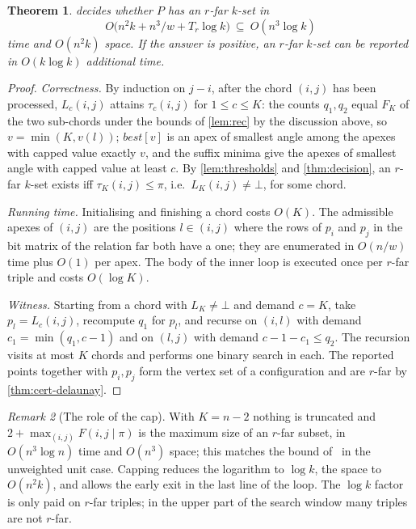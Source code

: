 \documentclass[11pt,a4paper]{article}
\newtheorem{theorem}{Theorem}
\theoremstyle{definition}
\theoremstyle{remark}
\newtheorem{remark}[theorem]{Remark}
\newcommand{\far}{\mathrm{far}}
\newcommand{\Tr}{T_r}
\newcommand{\nil}{\bot}
\begin{document}
\begin{theorem}\label{thm:decision-alg}
 decides whether $P$ has an $r$-far $k$-set in
\[
O\bigl(n^2k+n^3/w+\Tr\log k\bigr)\ \subseteq\ O(n^3\log k)
\]
time and $O(n^2k)$ space. If the answer is positive, an $r$-far $k$-set can be
reported in $O(k\log k)$ additional time.
\end{theorem}
\begin{proof}
\emph{Correctness.} By induction on $j-i$, after the chord $(i,j)$ has been
processed, $L_c(i,j)$ attains $\tau_c(i,j)$ for $1\le c\le K$: the counts
$q_1,q_2$ equal $F_K$ of the two sub-chords under the bounds of
\cref{lem:rec} by the discussion above, so $v=\min(K,v(l))$; $best[v]$ is an
apex of smallest angle among the apexes with capped value exactly $v$, and the
suffix minima give the apexes of smallest angle with capped value at least
$c$. By \cref{lem:thresholds} and \cref{thm:decision}, an $r$-far $k$-set
exists iff $\tau_K(i,j)\le\pi$, i.e.\ $L_K(i,j)\ne\nil$, for some chord.

\emph{Running time.} Initialising and finishing a chord costs $O(K)$. The
admissible apexes of $(i,j)$ are the positions $l\in(i,j)$ where the rows of
$p_i$ and $p_j$ in the bit matrix of the relation $\far$ both have a one; they
are enumerated in $O(n/w)$ time plus $O(1)$ per apex. The body of the inner
loop is executed once per $r$-far triple and costs $O(\log K)$.

\emph{Witness.} Starting from a chord with $L_K\ne\nil$ and demand $c=K$,
take $p_l=L_c(i,j)$, recompute $q_1$ for $p_l$, and recurse on $(i,l)$ with
demand $c_1=\min(q_1,c-1)$ and on $(l,j)$ with demand $c-1-c_1\le q_2$. The
recursion visits at most $K$ chords and performs one binary search in each.
The reported points together with $p_i,p_j$ form the vertex set of a
configuration and are $r$-far by \cref{thm:cert-delaunay}.
\end{proof}

\begin{remark}[The role of the cap]\label{rem:cap}
With $K=n-2$ nothing is truncated and $2+\max_{(i,j)}F(i,j\mid\pi)$ is the
maximum size of an $r$-far subset, in $O(n^3\log n)$ time and $O(n^3)$ space;
this matches the bound of~\cite{tw26} in the unweighted unit case. Capping
reduces the logarithm to $\log k$, the space to $O(n^2k)$, and allows the
early exit in the last line of the loop. The $\log k$ factor is only paid on
$r$-far triples; in the upper part of the search window many triples are not
$r$-far.
\end{remark}
\end{document}

